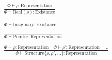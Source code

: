 \documentclass {article}
\begin{document}
\begin{gather*}
\\
\frac
{\Phi \vdash \rho : \text{Representation}}
{\Phi \vdash \text{Real} (\rho) : \text{Existance}} \\
\\
\frac
{}
{\Phi \vdash \text{Imaginary} : \text{Existance}} \\
\\
\frac
{}
{\Phi \vdash \text{Pointer} : \text{Representation}} \\
\\
\frac
{\Phi \vdash \rho : \text{Representation} \quad \Phi \vdash \rho' : \text{Representation} \quad \dots}
{\Phi \vdash \text{Structure} \{ \rho, \rho', \dots \} : \text{Representation} } \\
\end{gather*}
\end{document}
